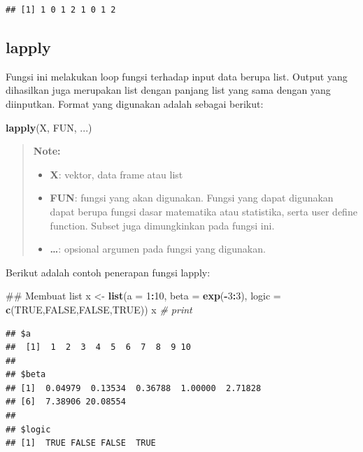 \documentclass[]{book}
\newenvironment{Shaded}{\begin{snugshade}}{\end{snugshade}}
\newcommand{\KeywordTok}[1]{\textcolor[rgb]{0.13,0.29,0.53}{\textbf{#1}}}
\newcommand{\DataTypeTok}[1]{\textcolor[rgb]{0.13,0.29,0.53}{#1}}
\newcommand{\DecValTok}[1]{\textcolor[rgb]{0.00,0.00,0.81}{#1}}
\newcommand{\StringTok}[1]{\textcolor[rgb]{0.31,0.60,0.02}{#1}}
\newcommand{\CommentTok}[1]{\textcolor[rgb]{0.56,0.35,0.01}{\textit{#1}}}
\newcommand{\OtherTok}[1]{\textcolor[rgb]{0.56,0.35,0.01}{#1}}
\newcommand{\OperatorTok}[1]{\textcolor[rgb]{0.81,0.36,0.00}{\textbf{#1}}}
\newcommand{\NormalTok}[1]{#1}
\providecommand{\tightlist}{%
  \setlength{\itemsep}{0pt}\setlength{\parskip}{0pt}}
\begin{document}
\begin{verbatim}
## [1] 1 0 1 2 1 0 1 2
\end{verbatim}

\subsection{lapply}\label{lapply}

Fungsi ini melakukan loop fungsi terhadap input data berupa list. Output
yang dihasilkan juga merupakan list dengan panjang list yang sama dengan
yang diinputkan. Format yang digunakan adalah sebagai berikut:

\begin{Shaded}
\begin{Highlighting}[]
\KeywordTok{lapply}\NormalTok{(X, FUN, ...)}
\end{Highlighting}
\end{Shaded}

\begin{quote}
\textbf{Note: }

\begin{itemize}
\tightlist
\item
  \textbf{X}: vektor, data frame atau list
\item
  \textbf{FUN}: fungsi yang akan digunakan. Fungsi yang dapat digunakan
  dapat berupa fungsi dasar matematika atau statistika, serta user
  define function. Subset juga dimungkinkan pada fungsi ini.
\item
  \textbf{\ldots{}}: opsional argumen pada fungsi yang digunakan.
\end{itemize}
\end{quote}

Berikut adalah contoh penerapan fungsi lapply:

\begin{Shaded}
\begin{Highlighting}[]
\NormalTok{## Membuat list}
\NormalTok{x <-}\StringTok{ }\KeywordTok{list}\NormalTok{(}\DataTypeTok{a =} \DecValTok{1}\OperatorTok{:}\DecValTok{10}\NormalTok{, }\DataTypeTok{beta =} \KeywordTok{exp}\NormalTok{(}\OperatorTok{-}\DecValTok{3}\OperatorTok{:}\DecValTok{3}\NormalTok{), }\DataTypeTok{logic =} \KeywordTok{c}\NormalTok{(}\OtherTok{TRUE}\NormalTok{,}\OtherTok{FALSE}\NormalTok{,}\OtherTok{FALSE}\NormalTok{,}\OtherTok{TRUE}\NormalTok{))}
\NormalTok{x }\CommentTok{# print}
\end{Highlighting}
\end{Shaded}

\begin{verbatim}
## $a
##  [1]  1  2  3  4  5  6  7  8  9 10
## 
## $beta
## [1]  0.04979  0.13534  0.36788  1.00000  2.71828
## [6]  7.38906 20.08554
## 
## $logic
## [1]  TRUE FALSE FALSE  TRUE
\end{verbatim}
\end{document}
